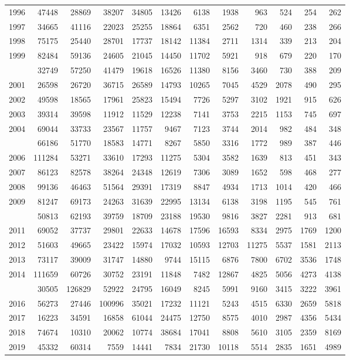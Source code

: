\documentclass[
]{article}
\begin{document}
\begin{longtable}[t]{lrrrrrrrrrrr}
1996 & 47448 & 28869 & 38207 & 34805 & 13426 & 6138 & 1938 & 963 & 524 & 254 & 262\\
1997 & 34665 & 41116 & 22023 & 25255 & 18864 & 6351 & 2562 & 720 & 460 & 238 & 266\\
1998 & 75175 & 25440 & 28701 & 17737 & 18142 & 11384 & 2711 & 1314 & 339 & 213 & 204\\
1999 & 82484 & 59136 & 24605 & 21045 & 14450 & 11702 & 5921 & 918 & 679 & 220 & 170\\
\addlinespace
2000 & 32749 & 57250 & 41479 & 19618 & 16526 & 11380 & 8156 & 3460 & 730 & 388 & 209\\
2001 & 26598 & 26720 & 36715 & 26589 & 14793 & 10265 & 7045 & 4529 & 2078 & 490 & 295\\
2002 & 49598 & 18565 & 17961 & 25823 & 15494 & 7726 & 5297 & 3102 & 1921 & 915 & 626\\
2003 & 39314 & 39598 & 11912 & 11529 & 12238 & 7141 & 3753 & 2215 & 1153 & 745 & 697\\
2004 & 69044 & 33733 & 23567 & 11757 & 9467 & 7123 & 3744 & 2014 & 982 & 484 & 348\\
\addlinespace
2005 & 66186 & 51770 & 18583 & 14771 & 8267 & 5850 & 3316 & 1772 & 989 & 387 & 446\\
2006 & 111284 & 53271 & 33610 & 17293 & 11275 & 5304 & 3582 & 1639 & 813 & 451 & 343\\
2007 & 86123 & 82578 & 38264 & 24348 & 12619 & 7306 & 3089 & 1652 & 598 & 468 & 277\\
2008 & 99136 & 46463 & 51564 & 29391 & 17319 & 8847 & 4934 & 1713 & 1014 & 420 & 466\\
2009 & 81247 & 69173 & 24263 & 31639 & 22995 & 13134 & 6138 & 3198 & 1195 & 545 & 761\\
\addlinespace
2010 & 50813 & 62193 & 39759 & 18709 & 23188 & 19530 & 9816 & 3827 & 2281 & 913 & 681\\
2011 & 69052 & 37737 & 29801 & 22633 & 14678 & 17596 & 16593 & 8334 & 2975 & 1769 & 1200\\
2012 & 51603 & 49665 & 23422 & 15974 & 17032 & 10593 & 12703 & 11275 & 5537 & 1581 & 2113\\
2013 & 73117 & 39009 & 31747 & 14880 & 9744 & 15115 & 6876 & 7800 & 6702 & 3536 & 1748\\
2014 & 111659 & 60726 & 30752 & 23191 & 11848 & 7482 & 12867 & 4825 & 5056 & 4273 & 4138\\
\addlinespace
2015 & 30505 & 126829 & 52922 & 24795 & 16049 & 8245 & 5991 & 9160 & 3415 & 3222 & 3961\\
2016 & 56273 & 27446 & 100996 & 35021 & 17232 & 11121 & 5243 & 4515 & 6330 & 2659 & 5818\\
2017 & 16223 & 34591 & 16858 & 61044 & 24475 & 12750 & 8575 & 4010 & 2987 & 4356 & 5434\\
2018 & 74674 & 10310 & 20062 & 10774 & 38684 & 17041 & 8808 & 5610 & 3105 & 2359 & 8169\\
2019 & 45332 & 60314 & 7559 & 14441 & 7834 & 21730 & 10118 & 5514 & 2835 & 1651 & 4989\\*
\end{longtable}
\end{document}

